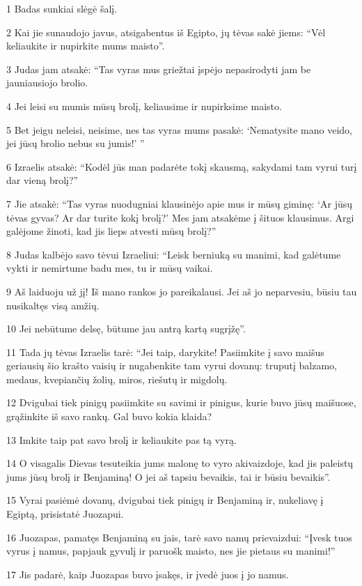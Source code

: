 \par 1 Badas sunkiai slėgė šalį. 
\par 2 Kai jie sunaudojo javus, atsigabentus iš Egipto, jų tėvas sakė jiems: “Vėl keliaukite ir nupirkite mums maisto”. 
\par 3 Judas jam atsakė: “Tas vyras mus griežtai įspėjo nepasirodyti jam be jauniausiojo brolio. 
\par 4 Jei leisi su mumis mūsų brolį, keliausime ir nupirksime maisto. 
\par 5 Bet jeigu neleisi, neisime, nes tas vyras mums pasakė: ‘Nematysite mano veido, jei jūsų brolio nebus su jumis!’ ” 
\par 6 Izraelis atsakė: “Kodėl jūs man padarėte tokį skausmą, sakydami tam vyrui turį dar vieną brolį?” 
\par 7 Jie atsakė: “Tas vyras nuodugniai klausinėjo apie mus ir mūsų giminę: ‘Ar jūsų tėvas gyvas? Ar dar turite kokį brolį?’ Mes jam atsakėme į šituos klausimus. Argi galėjome žinoti, kad jis lieps atvesti mūsų brolį?” 
\par 8 Judas kalbėjo savo tėvui Izraeliui: “Leisk berniuką su manimi, kad galėtume vykti ir nemirtume badu mes, tu ir mūsų vaikai. 
\par 9 Aš laiduoju už jį! Iš mano rankos jo pareikalausi. Jei aš jo neparvesiu, būsiu tau nusikaltęs visą amžių. 
\par 10 Jei nebūtume delsę, būtume jau antrą kartą sugrįžę”. 
\par 11 Tada jų tėvas Izraelis tarė: “Jei taip, darykite! Pasiimkite į savo maišus geriausių šio krašto vaisių ir nugabenkite tam vyrui dovanų: truputį balzamo, medaus, kvepiančių žolių, miros, riešutų ir migdolų. 
\par 12 Dvigubai tiek pinigų pasiimkite su savimi ir pinigus, kurie buvo jūsų maišuose, grąžinkite iš savo rankų. Gal buvo kokia klaida? 
\par 13 Imkite taip pat savo brolį ir keliaukite pas tą vyrą. 
\par 14 O visagalis Dievas tesuteikia jums malonę to vyro akivaizdoje, kad jis paleistų jums jūsų brolį ir Benjaminą! O jei aš tapsiu bevaikis, tai ir būsiu bevaikis”. 
\par 15 Vyrai pasiėmė dovanų, dvigubai tiek pinigų ir Benjaminą ir, nukeliavę į Egiptą, prisistatė Juozapui. 
\par 16 Juozapas, pamatęs Benjaminą su jais, tarė savo namų prievaizdui: “Įvesk tuos vyrus į namus, papjauk gyvulį ir paruošk maisto, nes jie pietaus su manimi!” 
\par 17 Jis padarė, kaip Juozapas buvo įsakęs, ir įvedė juos į jo namus. 
